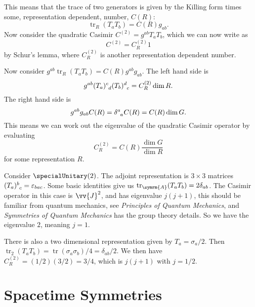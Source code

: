 \documentclass[fleqn]{NotesClass}
\newcommand{\course}[1]{\textit{#1}}
\newcommand{\ident}{1}
\DeclareMathOperator{\tr}{tr}
\begin{document}
    This means that the trace of two generators is given by the Killing form times some, representation dependent, number, \(C(R)\):
    \begin{equation}
        \tr_R(T_aT_b) = C(R)g_{ab}.
    \end{equation}
    Now consider the quadratic Casimir \(C^{(2)} = g^{ab}T_aT_b\), which we can now write as
    \begin{equation}
        C^{(2)} = C_R^{(2)}\ident
    \end{equation}
    by Schur's lemma, where \(C_R^{(2)}\) is another representation dependent number.
    
    Now consider \(g^{ab}\tr_R(T_aT_b) = C(R)g^{ab}g_{ab}\).
    The left hand side is 
    \begin{equation}
        g^{ab}\tensor{(T_a)}{^c_d}\tensor{(T_b)}{^d_c} = C_R^{(2)}\dim R.
    \end{equation}
    The right hand side is
    \begin{equation}
        g^{ab}g_{ab}C(R) = \tensor{\delta}{^a_a}C(R) = C(R) \dim G.
    \end{equation}
    This means we can work out the eigenvalue of the quadratic Casimir operator by evaluating
    \begin{equation}
        C_R^{(2)} = C(R)\frac{\dim G}{\dim R}
    \end{equation}
    for some representation \(R\).
    
    \begin{exm}{}{}
        Consider \(\specialUnitary(2)\).
        The adjoint representation is \(3 \times 3\) matrices \(\tensor{(T_a)}{^b_c} = \varepsilon_{bac}\).
        Some basic identities give us \(\tr_{\symrm{A}}(T_aT_b) = 2\delta_{ab}\).
        The Casimir operator in this case is \(\vv{J}^2\), and has eigenvalue \(j(j + 1)\), this should be familiar from quantum mechanics, see \course{Principles of Quantum Mechanics}, and \course{Symmetries of Quantum Mechanics} has the group theory details.
        So we have the eigenvalue \(2\), meaning \(j = 1\).
        
        There is also a two dimensional representation given by \(T_a = \sigma_a/2\).
        Then \(\tr_2(T_aT_b) = \tr(\sigma_a\sigma_b)/4 = \delta_{ab}/2\).
        We then have \(C_R^{(2)} = (1/2)(3/2) = 3/4\), which is \(j(j + 1)\) with \(j = 1/2\).
    \end{exm}
    
    \part{Spacetime Symmetries}
\end{document}
